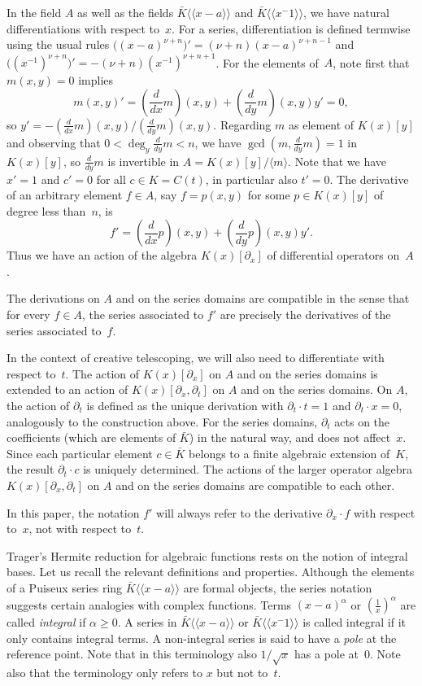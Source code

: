 \documentclass{sig-alternate}
\def\<#1>{\langle\!\langle#1\rangle\!\rangle} %
\begin{document}
In the field $A$ as well as the fields $\bar K\<x-a>$ and $\bar K\<x^{-1}>$, we have
natural differentiations with respect to~$x$. For a series, differentiation is defined
termwise using the usual rules $\bigl((x-a)^{\nu+n}\bigr)'=(\nu+n)(x-a)^{\nu+n-1}$ and
$\bigl((x^{-1})^{\nu+n}\bigr)'=-(\nu+n)(x^{-1})^{\nu+n+1}$. For the elements of~$A$, note
first that $m(x,y)=0$ implies
\begin{equation}\label{eq:yprime}
  m(x,y)'=(\frac d{dx}m)(x,y) + (\frac d{dy}m)(x,y)y' = 0,
\end{equation}
so $y'=-(\frac d{dx}m)(x,y)/(\frac d{dy}m)(x,y)$. Regarding $m$ as element of $K(x)[y]$
and observing that $0<\deg_y\frac d{dy}m<n$, we have $\gcd(m,\frac d{dy}m)=1$ in $K(x)[y]$,
so $\frac{d}{dy}m$ is invertible in $A=K(x)[y]/\langle m\rangle$.
Note that we have $x'=1$ and $c'=0$ for all $c\in K=C(t)$, in particular also $t'=0$.
The derivative of an arbitrary
element $f\in A$, say $f=p(x,y)$ for some $p\in K(x)[y]$ of degree less than~$n$, is
\[f'=(\frac{d}{dx}p)(x,y)+(\frac d{dy}p)(x,y)y'.\]
Thus we have an action of the algebra $K(x)[\partial_x]$ of differential operators on~$A$.

The derivations on $A$ and on the series domains are compatible in the sense
that for every $f\in A$, the series associated to $f'$ are precisely the
derivatives of the series associated to~$f$.

In the context of creative telescoping, we will also need to differentiate with
respect to~$t$. The action of $K(x)[\partial_x]$ on $A$ and on the series domains
is extended to an action of $K(x)[\partial_x,\partial_t]$ on $A$ and on the series
domains. On $A$, the action of $\partial_t$ is defined as the unique derivation with
$\partial_t\cdot t=1$ and $\partial_t\cdot x=0$, analogously to the construction
above. For the series domains, $\partial_t$ acts on the coefficients
(which are elements of $\bar K$) in the natural way, and does not affect~$x$.
Since each particular element $c\in\bar K$ belongs to a finite algebraic extension of~$K$,
the result $\partial_t\cdot c$ is uniquely determined.
The actions of the larger operator algebra
$K(x)[\partial_x,\partial_t]$ on $A$ and on the series domains are compatible to
each other.

In this paper, the notation $f'$ will always refer to the derivative $\partial_x\cdot f$
with respect to~$x$, not with respect to~$t$.

\medskip

Trager's Hermite reduction for algebraic functions rests on the notion of
integral bases. Let us recall the relevant definitions and properties.
Although the elements of a Puiseux series ring $\bar K\<x-a>$ are formal
objects, the series notation suggests certain analogies with complex
functions. Terms $(x-a)^\alpha$ or $(\tfrac1x)^\alpha$ are
called \emph{integral} if $\alpha\geq0$. A series in
$\bar K\<x-a>$ or $\bar K\<x^{-1}>$ is called integral if it only contains integral
terms. A non-integral series is said to have a \emph{pole} at the reference
point. Note that in this terminology also $1/\sqrt{x}$ has a pole
at~$0$. Note also that the terminology only refers to $x$ but not to~$t$.
\end{document}
